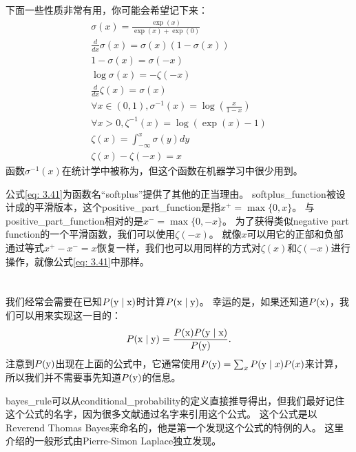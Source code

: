
下面一些性质非常有用，你可能会希望记下来：
\begin{gather}
\sigma(x) = \frac{\exp(x)}{\exp(x)+\exp(0)}\\
\frac{d}{dx} \sigma(x) = \sigma(x)(1 - \sigma(x))\\
1-\sigma(x) = \sigma(-x)\\
\log \sigma(x) = -\zeta(-x)\\
\frac{d}{dx} \zeta(x) = \sigma(x)\\
\forall x \in (0, 1), \sigma^{-1}(x) = \log \left (  \frac{x}{1-x} \right)\\
\forall x>0, \zeta^{-1}(x) = \log(\exp(x) - 1)\\
\zeta(x) = \int_{-\infty}^x \sigma(y) dy\\
\zeta(x) - \zeta(-x) = x
\label{eq: 3.41}
\end{gather}
函数$\sigma^{-1}(x)$在统计学中被称为，但这个函数在机器学习中很少用到。


公式\ref{eq: 3.41}为函数名``softplus''提供了其他的正当理由。
\gls{softplus_function}被设计成的平滑版本，这个\gls{positive_part_function}是指$x^+ = \max \{ 0, x\}$。
与\gls{positive_part_function}相对的是$x^- = \max\{ 0, -x\}$。
为了获得类似\gls{negative part function}的一个平滑函数，我们可以使用$\zeta(-x)$。
就像$x$可以用它的正部和负部通过等式$x^+ - x^- = x$恢复一样，我们也可以用同样的方式对$\zeta(x)$和$\zeta(-x)$进行操作，就像公式\ref{eq: 3.41}中那样。

\section{}
\label{sec:bayes_rule}

我们经常会需要在已知$P(\mathrm{y} \mid \mathrm{x})$时计算$P(\mathrm{x} \mid \mathrm{y})$。
幸运的是，如果还知道$P(\mathrm{x})$，我们可以用来实现这一目的：
\begin{equation}
P(\mathrm{x} \mid \mathrm{y}) = \frac{P(\mathrm{x}) P(\mathrm{y} \mid \mathrm{x})}{P(\mathrm{y})}.
\end{equation}
注意到$P(\mathrm{y})$出现在上面的公式中，它通常使用$P(\mathrm{y}) = \sum_x P(\mathrm{y} \mid x) P(x)$来计算，所以我们并不需要事先知道$P(\mathrm{y})$的信息。

\gls{bayes_rule}可以从\gls{conditional_probability}的定义直接推导得出，但我们最好记住这个公式的名字，因为很多文献通过名字来引用这个公式。
这个公式是以Reverend Thomas Bayes来命名的，他是第一个发现这个公式的特例的人。
这里介绍的一般形式由Pierre-Simon Laplace独立发现。

